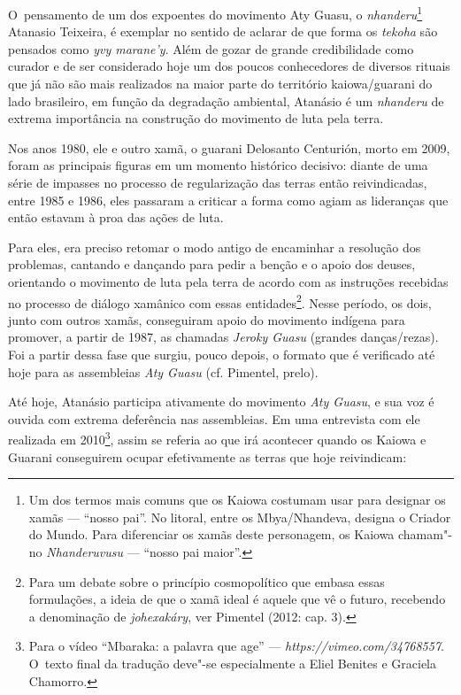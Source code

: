 O~pensamento de um dos expoentes do movimento Aty Guasu, o
\emph{nhanderu}\footnote{Um dos termos mais comuns que os Kaiowa costumam usar
para designar os xamãs --- ``nosso pai''. No litoral, entre os
Mbya/Nhandeva, designa o Criador do Mundo. Para diferenciar os xamãs
deste personagem, os Kaiowa chamam"-no \emph{Nhanderuvusu} --- ``nosso pai
maior''.} Atanasio Teixeira, é exemplar no sentido de aclarar de que
forma os \emph{tekoha} são pensados como \emph{yvy marane’y}. Além de gozar de grande
credibilidade como curador e de ser considerado hoje um dos poucos
conhecedores de diversos rituais que já não são mais realizados na
maior parte do território kaiowa/guarani do lado brasileiro, em função
da degradação ambiental, Atanásio é um \emph{nhanderu} de extrema importância
na construção do movimento de luta pela terra. 

Nos anos 1980, ele e outro xamã, o guarani Delosanto Centurión, morto em
2009, foram as principais figuras em um momento histórico decisivo:
diante de uma série de impasses no processo de regularização das terras
então reivindicadas, entre 1985 e 1986, eles passaram a criticar a
forma como agiam as lideranças que então estavam à proa das ações de
luta.

Para eles, era preciso retomar o modo antigo de encaminhar a resolução
dos problemas, cantando e dançando para pedir a benção e o apoio dos
deuses, orientando o movimento de luta pela terra de acordo com as
instruções recebidas no processo de diálogo xamânico com essas
entidades\footnote{Para um debate sobre o princípio cosmopolítico que
embasa essas formulações, a ideia de que o xamã ideal é aquele que vê o
futuro, recebendo a denominação de \emph{johexakáry}, ver Pimentel (2012: cap.
3).}. Nesse período, os dois, junto com outros xamãs, conseguiram apoio
do movimento indígena para promover, a partir de 1987, as chamadas
\emph{Jeroky Guasu} (grandes danças/rezas). Foi a partir dessa fase que
surgiu, pouco depois, o formato que é verificado até hoje para as
assembleias \emph{Aty Guasu} (cf. Pimentel, prelo).

Até hoje, Atanásio participa ativamente do movimento \emph{Aty Guasu}, e sua
voz é ouvida com extrema deferência nas assembleias. Em uma entrevista
com ele realizada em 2010\footnote{Para o vídeo ``Mbaraka: a palavra que
age'' --- \emph{https://vimeo.com/34768557}. O~texto
final da tradução deve"-se especialmente a Eliel Benites e Graciela
Chamorro.}, assim se referia ao que irá acontecer quando os Kaiowa e
Guarani conseguirem ocupar efetivamente as terras que hoje reivindicam:


